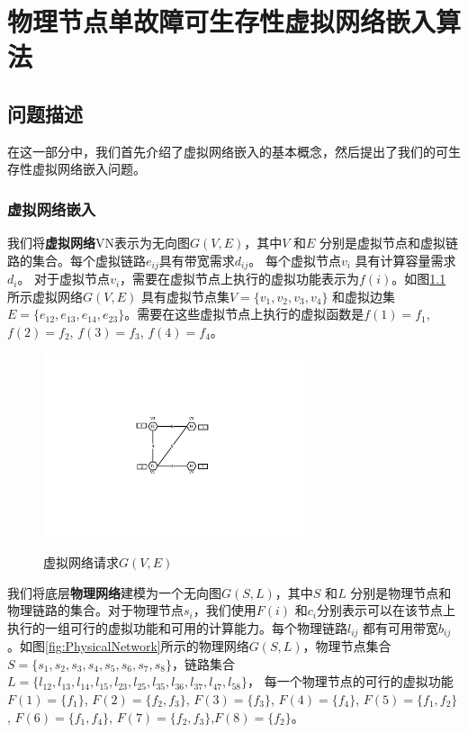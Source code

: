 \chapter{物理节点单故障可生存性虚拟网络嵌入算法}
\section{问题描述}
在这一部分中，我们首先介绍了虚拟网络嵌入的基本概念，然后提出了我们的可生存性虚拟网络嵌入问题。
\subsection{虚拟网络嵌入}
我们将\textbf{虚拟网络}VN表示为无向图$G (V,E)$，其中$V$ 和$E$ 分别是虚拟节点和虚拟链路的集合。每个虚拟链路$e_{ij}$具有带宽需求$d_{ij}$。 每个虚拟节点$v_i$ 具有计算容量需求$d_i$。 对于虚拟节点$v_i$，需要在虚拟节点上执行的虚拟功能表示为$f(i)$。如图\ref{fig:VirtualNetworkRequest} 所示虚拟网络$G (V,E)$ 具有虚拟节点集$V=\{v_1,v_2,v_3,v_4\}$ 和虚拟边集$E= \{e_{12},e_{13},e_{14},e_{23}\}$。需要在这些虚拟节点上执行的虚拟函数是$f(1)=f_1$, $f(2)=f_2$, $f(3)=f_3$, $f(4)=f_4$。

\begin{figure}[htbp]
\centering
\includegraphics[width=3.0in]{figures/VirtualNetworkRequest}\\
\caption{虚拟网络请求$G(V,E)$
}\label{fig:VirtualNetworkRequest}
\end{figure}

我们将底层\textbf{物理网络}建模为一个无向图$G (S,L)$，其中$S$ 和$L$ 分别是物理节点和物理链路的集合。对于物理节点$s_i$，我们使用$F(i)$ 和$c_i$分别表示可以在该节点上执行的一组可行的虚拟功能和可用的计算能力。每个物理链路$l_{ij}$ 都有可用带宽$b_{ij}$。如图\ref{fig:PhysicalNetwork}所示的物理网络$G (S,L)$，物理节点集合$S=\{s_1,s_2,s_3,s_4,s_5,s_6,s_7,s_8\}$，链路集合$L=\{l_{12},l_{13},l_{14},l_{15},l_{23},l_{25},l_{35},l_{36},l_{37},l_{47},l_{58}\}$，
每一个物理节点的可行的虚拟功能$F(1)=\{f_1\}$, $F(2)=\{f_2,f_3\}$, $F(3)=\{f_3\}$, $F(4)=\{f_4\}$, $F(5)=\{f_1,f_2\}$, $F(6)=\{f_1,f_4\}$, $F(7)=\{f_2,f_3\}$,$F(8)=\{f_2\}$。

